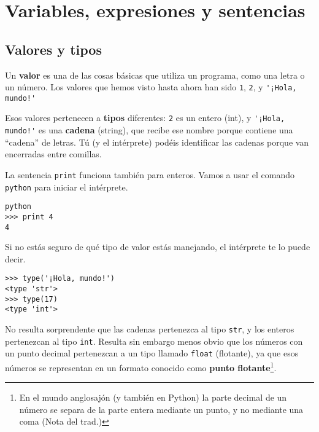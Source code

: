 
\chapter{Variables, expresiones y sentencias}

\section{Valores y tipos}

Un {\bf valor} es una de las cosas básicas que utiliza un programa,
como una letra o un número.
Los valores que hemos visto hasta ahora
han sido {\tt 1}, {\tt 2}, y
\verb"'¡Hola, mundo!'"

Esos valores pertenecen a {\bf tipos} diferentes:
{\tt 2} es un entero (int), y \verb"'¡Hola, mundo!'" es una {\bf cadena} (string),
que recibe ese nombre porque contiene una ``cadena'' de letras.
Tú (y el intérprete) podéis identificar
las cadenas porque van encerradas entre comillas.


La sentencia {\tt print} funciona también para enteros. Vamos a usar el
comando {\tt python} para iniciar el intérprete.

\beforeverb
\begin{verbatim}
python
>>> print 4
4
\end{verbatim}
\afterverb
%
Si no estás seguro de qué tipo de valor estás manejando, el intérprete te lo puede decir.

\beforeverb
\begin{verbatim}
>>> type('¡Hola, mundo!')
<type 'str'>
>>> type(17)
<type 'int'>
\end{verbatim}
\afterverb
%
No resulta sorprendente que las cadenas pertenezca al tipo {\tt str}, y los
enteros pertenezcan al tipo {\tt int}. Resulta sin embargo menos obvio
que los números con un punto decimal pertenezcan a un tipo llamado {\tt float} (flotante),
ya que esos números se representan en un formato
conocido como {\bf punto flotante}\footnote{En el mundo anglosajón (y también en Python)
la parte decimal de un número se separa de la parte entera mediante un punto, y no mediante una coma
(Nota del trad.)}.


